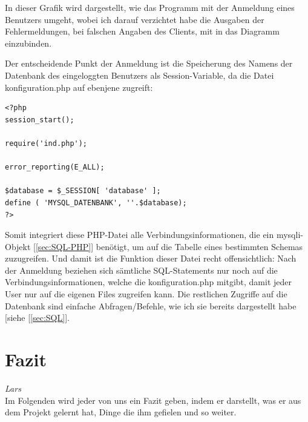 \documentclass[12pt,a4paper,bibliography=totocnumbered,listof=totocnumbered]{scrartcl}
\begin{document}
In dieser Grafik wird dargestellt, wie das Programm mit der Anmeldung eines Benutzers umgeht, wobei ich darauf verzichtet habe die Ausgaben der Fehlermeldungen, bei falschen Angaben des Clients, mit in das Diagramm einzubinden.

Der entscheidende Punkt der Anmeldung ist die Speicherung des Namens der Datenbank des eingeloggten Benutzers als Session-Variable, da die Datei \glqq konfiguration.php\grqq{} auf ebenjene zugreift:

\vspace{1em}
\begin{lstlisting}[caption= Konfiguration.php, label=lst:konfiguration.php]
<?php
session_start();

require('ind.php');

error_reporting(E_ALL);

$database = $_SESSION[ 'database' ];
define ( 'MYSQL_DATENBANK', ''.$database);
?>
\end{lstlisting}

Somit integriert diese PHP-Datei alle Verbindungsinformationen, die ein \glqq mysqli-Objekt\grqq{} [\ref{sec:SQL-PHP}] benötigt, um auf die Tabelle eines bestimmten Schemas zuzugreifen.
Und damit ist die Funktion dieser Datei recht offensichtlich:
Nach der Anmeldung beziehen sich sämtliche SQL-Statements nur noch auf die Verbindungsinformationen, welche die \glqq konfiguration.php\grqq{} mitgibt, damit jeder User nur auf die eigenen Files zugreifen kann.
Die restlichen Zugriffe auf die Datenbank sind einfache Abfragen/Befehle, wie ich sie bereits dargestellt habe [siehe [\ref{sec:SQL}]. 
\pagebreak
\section{Fazit}
\label{sec:Fazit}
\emph{Lars}\\
Im Folgenden wird jeder von uns ein Fazit geben, indem er darstellt, was er aus dem Projekt gelernt hat, Dinge die ihm gefielen und so weiter.
\end{document}
